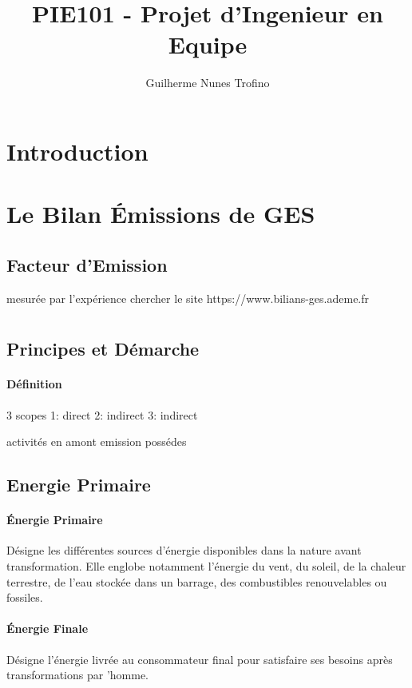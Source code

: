 \documentclass{article}
\title{PIE101 - Projet d'Ingenieur en Equipe}
\author{Guilherme Nunes Trofino}
\begin{document}
\maketitle

\newpage\tableofcontents

\section{Introduction}
\section{Le Bilan Émissions de GES}
\subsection{Facteur d'Emission}
mesurée par l'expérience
chercher le site https://www.bilians-ges.ademe.fr


\section{}
\subsection{Principes et Démarche}
\paragraph{Définition}
3 scopes
1: direct
2: indirect
3: indirect

activités en amont
emission possédes

\subsection{Energie Primaire}
\paragraph{Énergie Primaire}Désigne les différentes sources d'énergie disponibles dans la nature avant transformation. Elle englobe notamment l'énergie du vent, du soleil, de la chaleur terrestre, de l'eau stockée dans un barrage, des combustibles renouvelables ou fossiles.

\paragraph{Énergie Finale }Désigne l'énergie livrée au consommateur final pour satisfaire ses besoins après transformations par 'homme.\\
\end{document}
